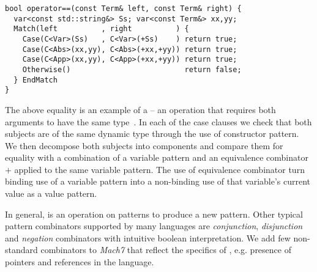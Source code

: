 \begin{lstlisting}[columns=flexible]
bool operator==(const Term& left, const Term& right) {
  var<const std::string&> Ss; var<const Term&> xx,yy;
  Match(left          , right          ) {
    Case(C<Var>(Ss)   , C<Var>(+Ss)    ) return true;
    Case(C<Abs>(xx,yy), C<Abs>(+xx,+yy)) return true;
    Case(C<App>(xx,yy), C<App>(+xx,+yy)) return true;
    Otherwise()                          return false;
  } EndMatch
}
\end{lstlisting}

\noindent
The above equality is an example of a  -- an operation that 
requires both arguments to have the same type~\cite{BCCLP95}. In each of the 
case clauses we check that both subjects are of the same dynamic type through 
the use of constructor pattern. We then decompose both subjects into 
components and compare them for equality with a combination of a variable pattern 
and an equivalence combinator $+$ applied to the same variable pattern. The use 
of equivalence combinator turn binding use of a variable pattern into a 
non-binding use of that variable's current value as a value pattern.

In general,  is an operation on patterns to produce a 
new pattern. Other typical pattern combinators supported by many languages are
\emph{conjunction}, \emph{disjunction} and \emph{negation} combinators with 
intuitive boolean interpretation. We add few non-standard combinators to 
\emph{Mach7} that reflect the specifics of \Cpp{}, e.g. presence of pointers and 
references in the language.

